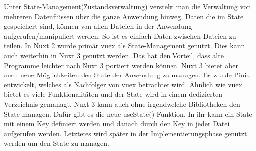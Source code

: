 Unter State-Management(Zustandsverwaltung) versteht man die Verwaltung von mehreren Datenflüssen über die ganze Anwendung hinweg. Daten die im State gespeichert sind, können von allen Dateien in der Anwendung aufgerufen/manipuliert werden. So ist es einfach Daten zwischen Dateien zu teilen. In Nuxt 2 wurde primär vuex als State-Management genutzt. Dies kann auch weiterhin in Nuxt 3 genutzt werden. Das hat den Vorteil, dass alte Programme leichter nach Nuxt 3 portiert werden können. Nuxt 3 bietet aber auch neue Möglichkeiten den State der Anwendung zu managen. Es wurde Pinia entwickelt, welches als Nachfolger von vuex betrachtet wird. Ähnlich wie vuex bietet es viele Funktionalitäten und der State wird in einem dedizierten Verzeichnis gemanagt. Nuxt 3 kann auch ohne irgendwelche Bibliotheken den State managen. Dafür gibt es die neue useState() Funktion. In ihr kann ein State mit einem Key definiert werden und danach durch den Key in jeder Datei aufgerufen werden. Letzteres wird später in der Implementierungsphase genutzt werden um den State zu managen.